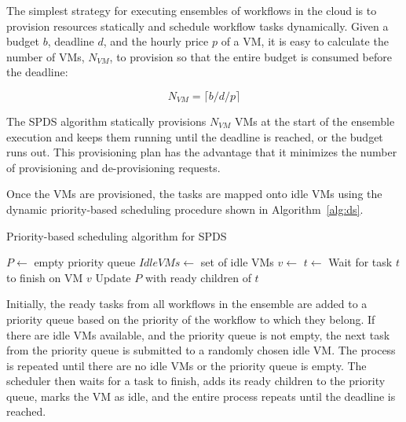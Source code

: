 \documentclass{sig-alternate}
\begin{document}
The simplest strategy for executing ensembles of workflows in the cloud is to
provision resources statically and schedule workflow tasks dynamically. Given a 
budget $b$, deadline $d$, and the hourly price $p$ of a VM, it is easy to calculate
the number of VMs, $N_{VM}$, to provision so that the entire budget is consumed before
the deadline:

\begin{equation}
\label{eq:static-plan}
N_{VM} = \lceil b / d / p \rceil
\end{equation}

The SPDS algorithm statically provisions $N_{VM}$ VMs at the start of the ensemble execution 
and keeps them running until the deadline is reached, or the budget runs out.
This provisioning plan has the advantage that it minimizes the number of provisioning 
and de-provisioning requests.

Once the VMs are provisioned, the tasks are mapped onto idle VMs using the dynamic
priority-based scheduling procedure shown in Algorithm~\ref{alg:ds}.

\begin{algorithm}
\caption{Priority-based scheduling algorithm for SPDS}
\label{alg:ds}
\begin{algorithmic}[1]
    \State $P\gets$ empty priority queue
	\State $IdleVMs\gets$ set of idle VMs
    	\State {} 
    \EndFor
    		\State $v\gets$ 
    		\State $t\gets$ 
    		\State {}
    	\EndWhile
    	\State Wait for task $t$ to finish on VM $v$
    	\State Update $P$ with ready children of $t$
		\State {}
    \EndWhile
\EndProcedure
\end{algorithmic} 
\end{algorithm}

Initially, the ready tasks from all workflows in the ensemble are added to a 
priority queue based on the priority of the workflow to which they belong. If
there are idle VMs available, and the priority queue is not empty, the next task
from the priority queue is submitted to a randomly chosen idle VM. The process is 
repeated until there are no idle VMs or the priority queue is empty. The scheduler
then waits for a task to finish, adds its ready children to the priority queue,
marks the VM as idle, and the entire process repeats until the deadline is reached.
\end{document}
